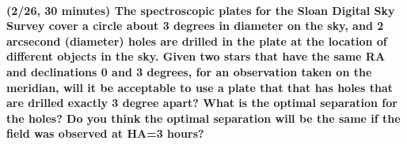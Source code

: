 \documentclass[12pt]{article}
\begin{document}
\paragraph{(2/26, 30 minutes) The spectroscopic plates for the Sloan
Digital Sky Survey cover a circle about 3 degrees in diameter on the
sky, and 2 arcsecond (diameter) holes are drilled in the plate at the
location of different objects in the sky. Given two stars that have
the same RA and declinations 0 and 3 degrees, for an observation taken
on the meridian, will it be acceptable to use a plate that that has
holes that are drilled exactly 3 degree apart? What is the optimal
separation for the holes? Do you think the optimal separation will be
the same if the field was observed at HA=3 hours?}
\end{document}
